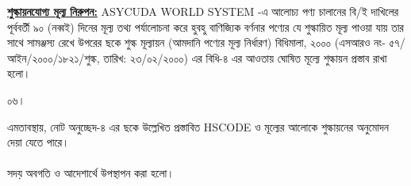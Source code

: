 \documentclass[12pt]{article}
\begin{document}
\begin{minipage}[t]{0.95\linewidth}
\underline{\textbf{শুল্কায়নযোগ্য মূল্য নিরুপন:}} ASYCUDA WORLD SYSTEM
-এ আলোচ্য পণ্য চালানের বি/ই দাখিলের পূর্ববর্তী ৯০ (নব্বই) দিনের
মূল্য তথ্য পর্যালোচনা করে হুবহু বাণিজ্যিক বর্ণনার পণ্যের যে শুল্কায়িত
মূল্য পাওয়া যায় তার সাথে সামঞ্জস্য রেখে উপরের ছকে
শুল্ক মূল্যায়ন (আমদানি পণ্যের মূল্য নির্ধারণ) বিধিমালা,
২০০০ (এসআরও নং- ৫৭/আইন/২০০০/১৮২১/শুল্ক, তারিখ: ২৩/০২/২০০০)
এর বিধি-৪ এর আওতায় ঘোষিত মূল্যে শুল্কায়ন প্রস্তাব রাখা হলো।
\\
\end{minipage}
\begin{minipage}[t]{0.05\linewidth}
০৬।
\end{minipage}
\begin{minipage}[t]{0.95\linewidth}
এমতাবস্থায়, নোট অনুচ্ছেদ-৪ এর ছকে
উল্লেখিত প্রস্তাবিত HSCODE ও মূল্যের
আলোকে শুল্কায়নের অনুমোদন দেয়া যেতে পারে।
\\
\\
সদয় অবগতি ও আদেশার্থে উপস্থাপন করা হলো।

\end{minipage}

\thispagestyle{laststyle}
\end{document}
